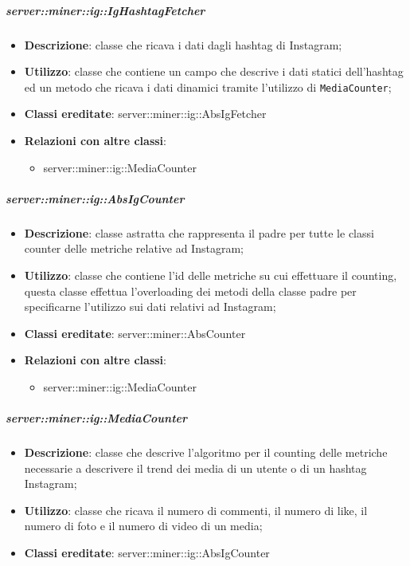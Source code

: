 	\subparagraph{server::miner::ig::IgHashtagFetcher} %
		\label{subp:server_miner_ig_IgHashtagFetcher}
			\begin{itemize}
				\item \textbf{Descrizione}: classe che ricava i dati dagli hashtag di Instagram;
				\item \textbf{Utilizzo}: classe che contiene un campo che descrive i dati statici dell'hashtag ed un metodo che ricava i dati dinamici tramite l'utilizzo di \texttt{MediaCounter};
				\item \textbf{Classi ereditate}: server::miner::ig::AbsIgFetcher
				\item \textbf{Relazioni con altre classi}:
					\begin{itemize}
						\item server::miner::ig::MediaCounter
					\end{itemize}
			\end{itemize}

	\subparagraph{server::miner::ig::AbsIgCounter} %
		\label{subp:server_miner_ig_AbsIgCounter}
			\begin{itemize}
				\item \textbf{Descrizione}: classe astratta che rappresenta il padre per tutte le classi counter delle metriche relative ad Instagram;
				\item \textbf{Utilizzo}: classe che contiene l’id delle metriche su cui effettuare il counting, questa classe effettua l'overloading dei metodi della classe padre per specificarne l’utilizzo sui dati relativi ad Instagram;
				\item \textbf{Classi ereditate}: server::miner::AbsCounter
				\item \textbf{Relazioni con altre classi}:
					\begin{itemize}
						\item server::miner::ig::MediaCounter
					\end{itemize}
			\end{itemize}


	\subparagraph{server::miner::ig::MediaCounter} %
		\label{subp:server_miner_ig_MediaCounter}
			\begin{itemize}
				\item \textbf{Descrizione}: classe che descrive l'algoritmo per il counting delle metriche necessarie a descrivere il trend dei media di un utente o di un hashtag  Instagram;
				\item \textbf{Utilizzo}: classe che ricava il numero di commenti, il numero di like, il numero di foto e il numero di video di un media;
				\item \textbf{Classi ereditate}: server::miner::ig::AbsIgCounter
			\end{itemize}


